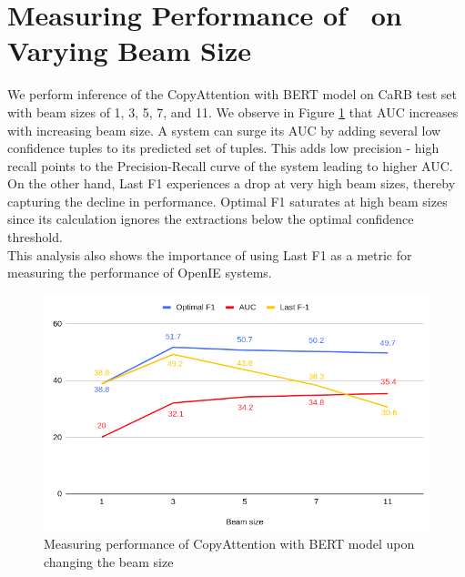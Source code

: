 \section{Measuring Performance of \shortname\ on Varying Beam Size}
    We perform inference of the CopyAttention with BERT model on CaRB test set with beam sizes of 1, 3, 5, 7, and 11. We observe in Figure \ref{fig2} that AUC increases with increasing beam size. A system can surge its AUC by adding several low confidence tuples to its predicted set of tuples. This adds low precision - high recall points to the Precision-Recall curve of the system leading to higher AUC.\\
    On the other hand, Last F1 experiences a drop at very high beam sizes, thereby capturing the decline in performance. Optimal F1 saturates at high beam sizes since its calculation ignores the extractions below the optimal confidence threshold.\\
    This analysis also shows the importance of using Last F1 as a metric for measuring the performance of OpenIE systems.
    
    \begin{figure}
    \begin{center}
    \advance\leftskip-3cm
    \advance\rightskip-3cm
    \includegraphics[keepaspectratio=true,width=\hsize]{images/imojie/Fig2.png}
    \caption{Measuring performance of CopyAttention with BERT model upon changing the beam size}
    \label{fig2}
    \end{center}
    \end{figure}
    
